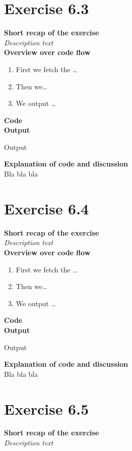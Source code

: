 \documentclass{article}
\newcommand\pythonstyle{\lstset{
language=python,
breaklines=true,
basicstyle=\ttfamily\small,
otherkeywords={1, 2, 3, 4, 5, 6, 7, 8 ,9 , 0, -, =, +, [, ], (, \), \{, \}, :, *, !},             %
keywordstyle=\color{blue},
emph={class, pass, in, for, while, if, is, elif, else, not, and, or, OR
    def, print, exec, break, continue, return},
emphstyle=\color{black}\bfseries,
emph={[2]True, False, None, self},
emphstyle=[2]\color{purple},
emph={[3]from, import, as},
emphstyle=[3]\color{blue},
stringstyle=\color{red},
frame=tb,
showstringspaces=false,
morecomment=[s]{"""}{"""},
commentstyle=\color{gray},
rulesepcolor=\color{blue},
title=\lstname
}}
\newcommand\pythonexternal[2][]{{
\pythonstyle
}}
\begin{document}
\section{Exercise 6.3}
\textbf{Short recap of the exercise}\\
\textit{Description text}\\

\textbf{Overview over code flow}\\

\begin{enumerate}
  \item First we fetch the \ldots
  \item Then we\ldots
  \item We output \ldots\\
\end{enumerate}

\textbf{Code}\\
\textbf{Output}
\begin{pythonOutput}
Output
\end{pythonOutput}
\textbf{Explanation of code and discussion}\\
Bla bla bla
\section{Exercise 6.4}
\textbf{Short recap of the exercise}\\
\textit{Description text}\\

\textbf{Overview over code flow}\\

\begin{enumerate}
  \item First we fetch the \ldots
  \item Then we\ldots
  \item We output \ldots\\
\end{enumerate}

\textbf{Code}\\
\textbf{Output}
\begin{pythonOutput}
Output
\end{pythonOutput}
\textbf{Explanation of code and discussion}\\
Bla bla bla
\section{Exercise 6.5}
\textbf{Short recap of the exercise}\\
\textit{Description text}\\
\end{document}
